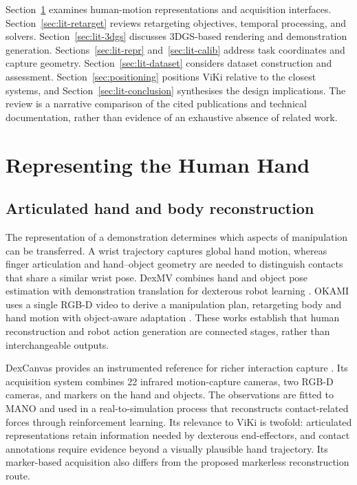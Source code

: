 Section~\ref{sec:lit-hand} examines human-motion representations and acquisition
interfaces. Section~\ref{sec:lit-retarget} reviews retargeting objectives,
temporal processing, and solvers. Section~\ref{sec:lit-3dgs} discusses 3DGS-based
rendering and demonstration generation. Sections~\ref{sec:lit-repr}
and~\ref{sec:lit-calib} address task coordinates and capture geometry.
Section~\ref{sec:lit-dataset} considers dataset construction and assessment.
Section~\ref{sec:positioning} positions ViKi relative to the closest systems,
and Section~\ref{sec:lit-conclusion} synthesises the design implications.
The review is a narrative comparison of the cited publications and technical
documentation, rather than evidence of an exhaustive absence of related work.

\section{Representing the Human Hand}
\label{sec:lit-hand}

\subsection{Articulated hand and body reconstruction}

The representation of a demonstration determines which aspects of manipulation
can be transferred. A wrist trajectory captures global hand motion, whereas
finger articulation and hand--object geometry are needed to distinguish
contacts that share a similar wrist pose. DexMV combines hand and object pose
estimation with demonstration translation for dexterous robot learning
\cite{dexmv}. OKAMI uses a single RGB-D video to derive a manipulation plan,
retargeting body and hand motion with object-aware adaptation
\cite{okami}. These works establish that human reconstruction and robot action
generation are connected stages, rather than interchangeable outputs.

DexCanvas provides an instrumented reference for richer interaction capture
\cite{dexcanvas}. Its acquisition system combines 22 infrared motion-capture
cameras, two RGB-D cameras, and markers on the hand and objects. The observations
are fitted to MANO and used in a real-to-simulation process that reconstructs
contact-related forces through reinforcement learning. Its relevance to ViKi
is twofold: articulated representations retain information needed by dexterous
end-effectors, and contact annotations require evidence beyond a visually
plausible hand trajectory. Its marker-based acquisition also differs from the
proposed markerless reconstruction route.


